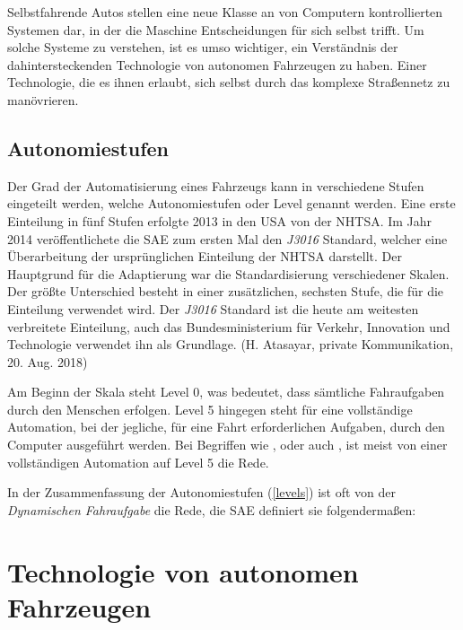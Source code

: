 Selbstfahrende Autos stellen eine neue Klasse an von Computern kontrollierten Systemen dar, in der die Maschine Entscheidungen für sich selbst trifft. Um solche Systeme zu verstehen, ist es umso wichtiger, ein Verständnis der dahintersteckenden Technologie von autonomen Fahrzeugen zu haben. Einer Technologie, die es ihnen erlaubt, sich selbst durch das komplexe Straßennetz zu manövrieren.

\subsection{Autonomiestufen}
Der Grad der Automatisierung eines Fahrzeugs kann in verschiedene Stufen eingeteilt werden, welche Autonomiestufen oder Level genannt werden. Eine erste Einteilung in fünf Stufen erfolgte 2013 in den USA von der \ac{NHTSA}. Im Jahr 2014 veröffentlichete die \ac{SAE} zum ersten Mal den \textit{J3016} Standard, welcher eine Überarbeitung der ursprünglichen Einteilung der \ac{NHTSA} darstellt. Der Hauptgrund für die Adaptierung war die Standardisierung verschiedener Skalen. Der größte Unterschied besteht in einer zusätzlichen, sechsten Stufe, die für die Einteilung verwendet wird.  Der \textit{J3016} Standard ist die heute am weitesten verbreitete Einteilung, auch das Bundesministerium für Verkehr, Innovation und Technologie verwendet ihn als Grundlage. (H. Atasayar, private Kommunikation, 20. Aug. 2018)

Am Beginn der Skala steht Level 0, was bedeutet, dass sämtliche Fahraufgaben durch den Menschen erfolgen. Level 5 hingegen steht für eine vollständige Automation, bei der jegliche, für eine Fahrt erforderlichen Aufgaben, durch den Computer ausgeführt werden. Bei Begriffen wie ,  oder auch , ist meist von einer vollständigen Automation auf Level 5 die Rede.

In der Zusammenfassung der Autonomiestufen (\ref{levels}) ist oft von der \textit{Dynamischen Fahraufgabe} die Rede, die \ac{SAE} definiert sie folgendermaßen: 

\nocite{wiki-levels}



\section{Technologie von autonomen Fahrzeugen}

